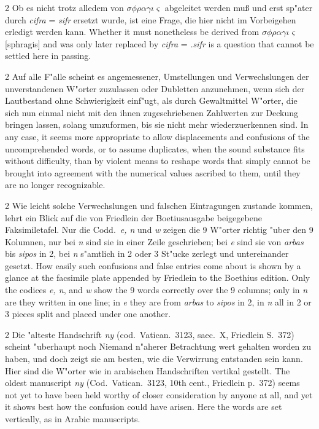 \documentclass[10pt,a4paper]{article}
\renewcommand{\switchcolumn}{\syncronize\nointerlineskip\columnbreak}
\begin{document}
\begin{paracol}{2}
Ob es nicht trotz alledem von $\sigma\phi\rho\alpha\gamma\iota\varsigma$ abgeleitet werden mu\ss{} und erst sp"ater durch \textit{cifra} = \textit{sifr} ersetzt wurde, ist eine Frage, die hier nicht im Vorbeigehen erledigt werden kann.
\switchcolumn
Whether it must nonetheless be derived from $\sigma\phi\rho\alpha\gamma\iota\varsigma$ [sphragis] and was only later replaced by \textit{cifra} = \textit{.sifr} is a question that cannot be settled here in passing.
\end{paracol}

\begin{paracol}{2}
Auf alle F"alle scheint es angemessener, Umstellungen und Verwechslungen der unverstandenen W"orter zuzulassen oder Dubletten anzunehmen, wenn sich der Lautbestand ohne Schwierigkeit einf"ugt, als durch Gewaltmittel W"orter, die sich nun einmal nicht mit den ihnen zugeschriebenen Zahlwerten zur Deckung bringen lassen, solang umzuformen, bis sie nicht mehr wiederzuerkennen sind.
\switchcolumn
In any case, it seems more appropriate to allow displacements and confusions of the uncomprehended words, or to assume duplicates, when the sound substance fits without difficulty, than by violent means to reshape words that simply cannot be brought into agreement with the numerical values ascribed to them, until they are no longer recognizable.
\end{paracol}

\begin{paracol}{2}
Wie leicht solche Verwechslungen und falschen Eintragungen zustande kommen, lehrt ein Blick auf die von Friedlein der Boetiusausgabe beigegebene Faksimiletafel. Nur die Codd.\ \textit{e, n} und \textit{w} zeigen die 9 W"orter richtig "uber den 9 Kolumnen, nur bei \textit{n} sind sie in einer Zeile geschrieben; bei \textit{e} sind sie von \textit{arbas} bis \textit{sipos} in 2, bei \textit{n} s"amtlich in 2 oder 3 St"ucke zerlegt und untereinander gesetzt.
\switchcolumn
How easily such confusions and false entries come about is shown by a glance at the facsimile plate appended by Friedlein to the Boethius edition. Only the codices \textit{e, n}, and \textit{w} show the 9 words correctly over the 9 columns; only in \textit{n} are they written in one line; in \textit{e} they are from \textit{arbas} to \textit{sipos} in 2, in \textit{n} all in 2 or 3 pieces split and placed under one another.
\end{paracol}

\begin{paracol}{2}
Die "alteste Handschrift \textit{ny} (cod.\ Vatican.\ 3123, saec.\ X, Friedlein S.\ 372) scheint "uberhaupt noch Niemand n"aherer Betrachtung wert gehalten worden zu haben, und doch zeigt sie am besten, wie die Verwirrung entstanden sein kann. Hier sind die W"orter wie in arabischen Handschriften vertikal gestellt.
\switchcolumn
The oldest manuscript \textit{ny} (Cod.\ Vatican.\ 3123, 10th cent., Friedlein p.\ 372) seems not yet to have been held worthy of closer consideration by anyone at all, and yet it shows best how the confusion could have arisen. Here the words are set vertically, as in Arabic manuscripts.
\end{paracol}
\end{document}
